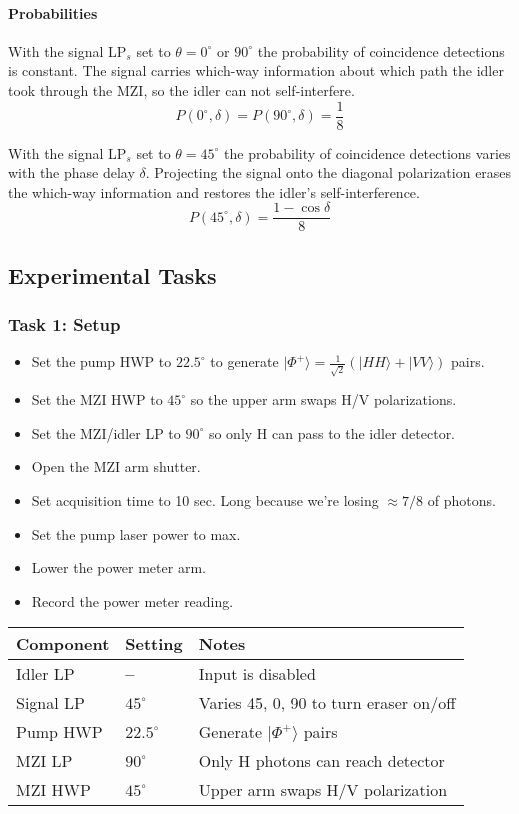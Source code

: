 \documentclass{article}
\begin{document}
\paragraph{Probabilities}

With the signal LP$_s$ set to $\theta=0^\circ$ or $90^\circ$ the probability of
coincidence detections is constant.
The signal carries which-way information about which path the idler took
through the MZI, so the idler can not self-interfere.
\[
P(0^\circ, \delta)=P(90^\circ, \delta)=\frac{1}{8}
\]

With the signal LP$_s$ set to $\theta=45^\circ$ the probability of
coincidence detections varies with the phase delay $\delta$.
Projecting the signal onto the diagonal polarization erases the
which-way information and restores the idler's self-interference.
\[
P(45^\circ, \delta)=\frac{1-\cos\delta}{8}
\]

\subsection*{Experimental Tasks}

\subsubsection*{Task 1: Setup}

\begin{itemize}
\item Set the pump HWP to $22.5^\circ$ to generate $| \Phi^+ \rangle = \frac{1}{\sqrt2}(|HH\rangle + |VV\rangle)$ pairs.
\item Set the MZI HWP to $45^\circ$ so the upper arm swaps H/V polarizations.
\item Set the MZI/idler LP to $90^\circ$ so only H can pass to the idler detector.
\item Open the MZI arm shutter.
\item Set acquisition time to 10 sec. Long because we're losing $\approx 7/8$ of photons.
\item Set the pump laser power to max.
\item Lower the power meter arm.
\item Record the power meter reading.
\end{itemize}

\begin{table}[h]
\centering
\begin{tabular}{lll}
\toprule
\textbf{Component} & \textbf{Setting} & Notes\\
\midrule
Idler LP  & \textbf{--} & Input is disabled \\
Signal LP & $45^\circ$ & Varies 45, 0, 90 to turn eraser on/off \\
Pump HWP  & $22.5^\circ$ & Generate $|\Phi^+ \rangle$ pairs \\
MZI LP    & $90^\circ$ & Only H photons can reach detector \\
MZI HWP   & $45^\circ$ & Upper arm swaps H/V polarization\\
\bottomrule
\end{tabular}
\end{table}
\end{document}
